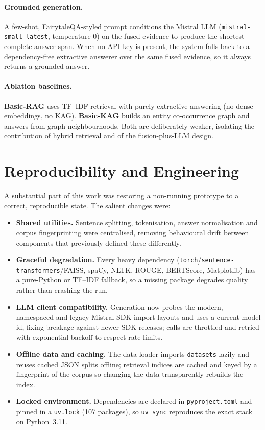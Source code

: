 \documentclass[11pt]{article}
\begin{document}
\paragraph{Grounded generation.} A few-shot, FairytaleQA-styled prompt conditions
the Mistral LLM (\texttt{mistral-small-latest}, temperature $0$) on the fused
evidence to produce the shortest complete answer span. When no API key is
present, the system falls back to a dependency-free extractive answerer over the
same fused evidence, so it always returns a grounded answer.

\paragraph{Ablation baselines.} \textbf{Basic-RAG} uses TF--IDF retrieval with
purely extractive answering (no dense embeddings, no KAG). \textbf{Basic-KAG}
builds an entity co-occurrence graph and answers from graph neighbourhoods. Both
are deliberately weaker, isolating the contribution of hybrid retrieval and of
the fusion-plus-LLM design.

\section{Reproducibility and Engineering}
\label{sec:repro}
A substantial part of this work was restoring a non-running prototype to a
correct, reproducible state. The salient changes were:
\begin{itemize}[noitemsep]
    \item \textbf{Shared utilities.} Sentence splitting, tokenisation, answer
    normalisation and corpus fingerprinting were centralised, removing
    behavioural drift between components that previously defined these
    differently.
    \item \textbf{Graceful degradation.} Every heavy dependency
    (\texttt{torch}/\texttt{sentence-transformers}/FAISS, spaCy, NLTK, ROUGE,
    BERTScore, Matplotlib) has a pure-Python or TF--IDF fallback, so a missing
    package degrades quality rather than crashing the run.
    \item \textbf{LLM client compatibility.} Generation now probes the modern,
    namespaced and legacy Mistral SDK import layouts and uses a current model id,
    fixing breakage against newer SDK releases; calls are throttled and retried
    with exponential backoff to respect rate limits.
    \item \textbf{Offline data and caching.} The data loader imports
    \texttt{datasets} lazily and reuses cached JSON splits offline; retrieval
    indices are cached and keyed by a fingerprint of the corpus so changing the
    data transparently rebuilds the index.
    \item \textbf{Locked environment.} Dependencies are declared in
    \texttt{pyproject.toml} and pinned in a \texttt{uv.lock} (107 packages), so
    \texttt{uv sync} reproduces the exact stack on Python~3.11.
\end{itemize}
\end{document}
